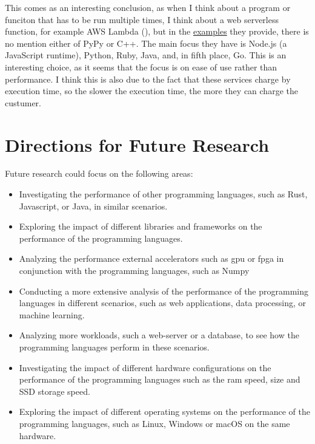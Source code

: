This comes as an interesting conclusion, as when I think about a program or funciton that has to be run multiple times, I think about a web serverless function, for example AWS Lambda (\cite{aws:lambda}), but in the \href{https://docs.aws.amazon.com/lambda/latest/dg/lambda-samples.html}{examples} they provide, there is no mention either of PyPy or C++. The main focus they have is Node.js (a JavaScript runtime), Python, Ruby, Java, and, in fifth place, Go. This is an interesting choice, as it seems that the focus is on ease of use rather than performance. I think this is also due to the fact that these services charge by execution time, so the slower the execution time, the more they can charge the custumer. 


\section{Directions for Future Research}
Future research could focus on the following areas:
\begin{itemize}
    \item Investigating the performance of other programming languages, such as Rust, Javascript, or Java, in similar scenarios.
    \item Exploring the impact of different libraries and frameworks on the performance of the programming languages.
    \item Analyzing the performance external accelerators such as \gls{gpu} or \gls{fpga} in conjunction with the programming languages, such as Numpy
    \item Conducting a more extensive analysis of the performance of the programming languages in different scenarios, such as web applications, data processing, or machine learning.
    \item Analyzing more workloads, such a web-server or a database, to see how the programming languages perform in these scenarios.
    \item Investigating the impact of different hardware configurations on the performance of the programming languages such as the \gls{ram} speed, size and SSD storage speed.
    \item Exploring the impact of different operating systems on the performance of the programming languages, such as Linux, Windows or macOS on the same hardware.
\end{itemize}